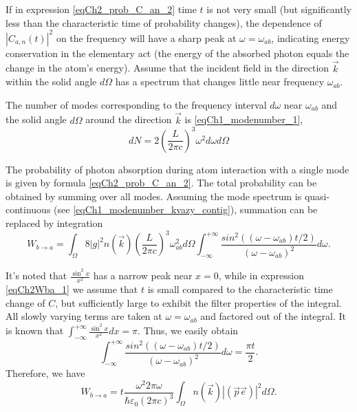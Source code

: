 If in expression \eqref{eqCh2_prob_C_an_2} time $t$ is not very small (but significantly less than the characteristic time of probability changes), the dependence of $\left|C_{a,n}\left(t\right)\right|^2$ on the frequency will have a sharp peak at $\omega = \omega_{ab}$, indicating energy conservation in the elementary act (the energy of the absorbed photon equals the change in the atom's energy). Assume that the incident field in the direction $\vec{k}$ within the solid angle $d \Omega$ has a spectrum that changes little near frequency $\omega_{ab}$. 

The number of modes corresponding to the frequency interval $d \omega$ near $\omega_{ab}$ and the solid angle $d \Omega$ around the direction $\vec{k}$ is \eqref{eqCh1_modenumber_1},
\begin{equation}
d N = 2 \left(\frac{L}{2 \pi c} \right)^3 \omega^2 d \omega d \Omega
\end{equation}

The probability of photon absorption during atom interaction with a single mode is given by formula \eqref{eqCh2_prob_C_an_2}. The total probability can be obtained by summing over all modes. Assuming the mode spectrum is quasi-continuous (see \eqref{eqCh1_modenumber_kvazy_contig}), summation can be replaced by integration
\begin{equation}
W_{b \rightarrow a} = \int_{\Omega} 8 \left|g\right|^2 n(\vec{k})
\left(\frac{L}{2 \pi c}\right)^3 \omega_{ab}^2 d \Omega 
\int_{-\infty}^{+\infty} 
\frac{sin^2\left(\left(\omega - 
  \omega_{ab}\right)t/2\right)} {\left(\omega - 
  \omega_{ab}\right)^2} d \omega.
\label{eqCh2Wba_1}
\end{equation}

It's noted that $\frac{\sin^2 x}{x^2}$ has a narrow peak near $x = 0$, while in expression \eqref{eqCh2Wba_1} we assume that $t$ is small compared to the characteristic time change of $C$, but sufficiently large to exhibit the filter properties of the integral. All slowly varying terms are taken at $\omega = \omega_{ab}$ and factored out of the integral. It is known that $\int_{-\infty}^{+\infty} \frac{\sin^2 x}{x^2} dx = \pi$. Thus, we easily obtain  
\[
\int_{-\infty}^{+\infty} \frac{sin^2\left(\left(\omega - 
  \omega_{ab}\right)t/2\right)} {\left(\omega - 
  \omega_{ab}\right)^2} d \omega = \frac{\pi t }{2}.
\]
Therefore, we have   
\begin{equation}
W_{b \rightarrow a} = t \frac{\omega^2 2 \pi \omega}
{\hbar \varepsilon_0 \left(2 \pi c\right)^3}\int_{\Omega} 
n(\vec{k})\left|\left(\vec{p} \vec{e}\right)\right|^2
d \Omega.
\label{eqCh2_Wab} 
\end{equation}

